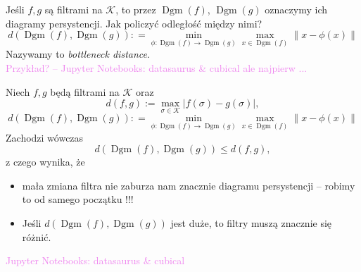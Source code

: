 \documentclass{beamer}
\newcommand{\comment}[1]{\textcolor{violet}{#1}}
\begin{document}
\begin{frame}
  Jeśli $f, g$ są filtrami na $\mathcal{K}$, to przez
  $\operatorname{Dgm}(f)$, $\operatorname{Dgm}(g)$ oznaczymy ich diagramy persystencji.
  Jak policzyć odległość między nimi?
  \pause
  \[
    d(\operatorname{Dgm}(f),\operatorname{Dgm}(g)):
      =\min_{\phi: \operatorname{Dgm}(f) \to \operatorname{Dgm}(g)}
      \max_{x \in \operatorname{Dgm}(f)} \| x - \phi(x) \|
  \]
  Nazywamy to \emph{bottleneck distance}.\\
  \pause
  \comment{Przykład? -- Jupyter Notebooks: datasaurus \& cubical ale najpierw ...}
\end{frame}

\begin{frame}
  Niech $f, g$ będą filtrami na $\mathcal{K}$ oraz
  \[
    d(f,g):=\max_{\sigma \in \mathcal{K}} \lvert f(\sigma) - g(\sigma) \rvert,
  \]
  \[
    d(\operatorname{Dgm}(f),\operatorname{Dgm}(g)):
      =\min_{\phi: \operatorname{Dgm}(f) \to \operatorname{Dgm}(g)}
      \max_{x \in \operatorname{Dgm}(f)} \| x - \phi(x) \|
  \]
  \pause
  Zachodzi wówczas
  \[
    d(\operatorname{Dgm}(f),\operatorname{Dgm}(g)) \leq  d(f,g),
  \]
  z czego wynika, że
  \begin{itemize}
    \pause\item mała zmiana filtra nie zaburza nam znacznie diagramu persystencji
      -- robimy to od samego początku !!!
    \pause\item Jeśli $d(\operatorname{Dgm}(f),\operatorname{Dgm}(g))$ jest duże,
      to filtry muszą znacznie się różnić.
  \end{itemize}
  \pause \comment{Jupyter Notebooks: datasaurus \& cubical}
\end{frame}
\end{document}
